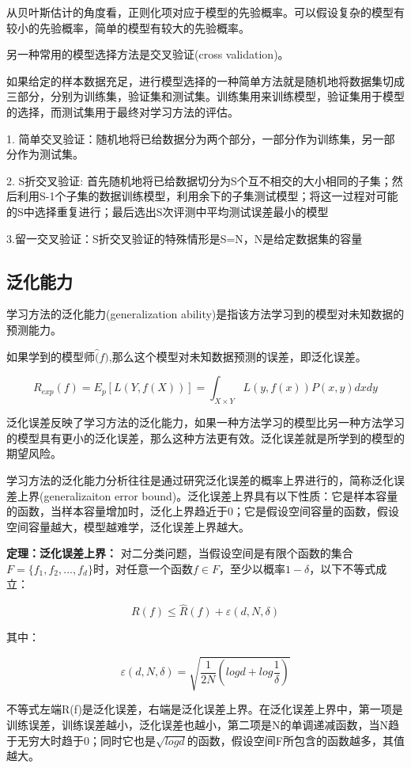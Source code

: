\documentclass{ctexart}
\begin{document}
	从贝叶斯估计的角度看，正则化项对应于模型的先验概率。可以假设复杂的模型有较小的先验概率，简单的模型有较大的先验概率。
	
	另一种常用的模型选择方法是交叉验证(cross validation)。
	
	如果给定的样本数据充足，进行模型选择的一种简单方法就是随机地将数据集切成三部分，分别为训练集，验证集和测试集。训练集用来训练模型，验证集用于模型的选择，而测试集用于最终对学习方法的评估。
	
	1. 简单交叉验证：随机地将已给数据分为两个部分，一部分作为训练集，另一部分作为测试集。
	
	2. S折交叉验证: 首先随机地将已给数据切分为S个互不相交的大小相同的子集；然后利用S-1个子集的数据训练模型，利用余下的子集测试模型；将这一过程对可能的S中选择重复进行；最后选出S次评测中平均测试误差最小的模型
	
	3.留一交叉验证：S折交叉验证的特殊情形是S=N，N是给定数据集的容量

	\subsection{泛化能力}
	
	学习方法的泛化能力(generalization ability)是指该方法学习到的模型对未知数据的预测能力。
	
	如果学到的模型师\(\hat(f)\),那么这个模型对未知数据预测的误差，即泛化误差。
	
	\[R_{exp}(f) = E_p[L(Y, f(X))] = \int_{X\times Y} L(y, f(x))P(x, y)dxdy\]
	
	泛化误差反映了学习方法的泛化能力，如果一种方法学习的模型比另一种方法学习的模型具有更小的泛化误差，那么这种方法更有效。泛化误差就是所学到的模型的期望风险。
	
	学习方法的泛化能力分析往往是通过研究泛化误差的概率上界进行的，简称泛化误差上界(generalizaiton error bound)。泛化误差上界具有以下性质：它是样本容量的函数，当样本容量增加时，泛化上界趋近于0；它是假设空间容量的函数，假设空间容量越大，模型越难学，泛化误差上界越大。
	
	\textbf{定理：泛化误差上界：} 对二分类问题，当假设空间是有限个函数的集合\(F = \{f_1, f_2,...,f_d\}\)时，对任意一个函数\(f \in F\)，至少以概率\(1-\delta\)，以下不等式成立：
	
	\[R(f) \leq \hat{R}(f) + \varepsilon(d, N, \delta)\]
	
	其中：
	
	\[\varepsilon(d, N, \delta) = \sqrt{\frac{1}{2N}(log d + log\frac{1}{\delta})}\]
	
	不等式左端R(f)是泛化误差，右端是泛化误差上界。在泛化误差上界中，第一项是训练误差，训练误差越小，泛化误差也越小，第二项是N的单调递减函数，当N趋于无穷大时趋于0；同时它也是\(\sqrt{logd}\)的函数，假设空间F所包含的函数越多，其值越大。
\end{document}
